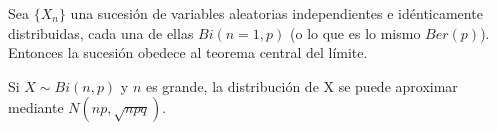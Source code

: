 \begin{teo}
Sea $\{X_n\}$ una sucesión de variables aleatorias independientes e idénticamente distribuidas, cada una de ellas $Bi(n = 1, p)$ (o lo que es lo mismo $Ber(p)$). Entonces la sucesión obedece al teorema central del límite.
\end{teo}

\begin{cor}
Si $X \sim Bi(n,p)$ y $n$ es grande, la distribución de X se puede aproximar mediante $N(np, \sqrt{npq})$.
\end{cor}

